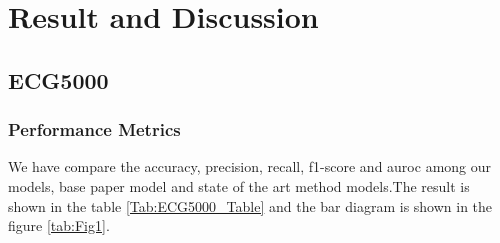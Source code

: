 \documentclass[nonacm,sigconf]{acmart}
\begin{document}
\section{Result and Discussion}
\subsection{ECG5000}

\subsubsection{\textbf{Performance Metrics}}
We have compare the accuracy, precision, recall, f1-score and auroc among our models, base paper model and state of the art method models.The result is shown in the table \ref{Tab:ECG5000_Table} and the bar diagram is shown in the figure \ref{tab:Fig1}.
\end{document}
